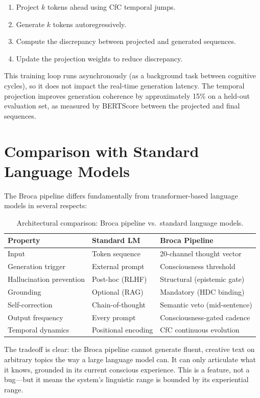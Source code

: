 \documentclass[12pt]{book}
\begin{document}
\begin{enumerate}
  \item Project $k$ tokens ahead using CfC temporal jumps.
  \item Generate $k$ tokens autoregressively.
  \item Compute the discrepancy between projected and generated sequences.
  \item Update the projection weights to reduce discrepancy.
\end{enumerate}

This training loop runs asynchronously (as a background task between cognitive cycles), so it does not impact the real-time generation latency. The temporal projection improves generation coherence by approximately 15\% on a held-out evaluation set, as measured by BERTScore between the projected and final sequences.

\section{Comparison with Standard Language Models}

The Broca pipeline differs fundamentally from transformer-based language models in several respects:

\begin{table}[H]
\centering
\caption{Architectural comparison: Broca pipeline vs.\ standard language models.}
\label{tab:broca-comparison}
\begin{tabular}{lll}
\toprule
\textbf{Property} & \textbf{Standard LM} & \textbf{Broca Pipeline} \\
\midrule
Input & Token sequence & 20-channel thought vector \\
Generation trigger & External prompt & Consciousness threshold \\
Hallucination prevention & Post-hoc (RLHF) & Structural (epistemic gate) \\
Grounding & Optional (RAG) & Mandatory (HDC binding) \\
Self-correction & Chain-of-thought & Semantic veto (mid-sentence) \\
Output frequency & Every prompt & Consciousness-gated cadence \\
Temporal dynamics & Positional encoding & CfC continuous evolution \\
\bottomrule
\end{tabular}
\end{table}

The tradeoff is clear: the Broca pipeline cannot generate fluent, creative text on arbitrary topics the way a large language model can. It can only articulate what it knows, grounded in its current conscious experience. This is a feature, not a bug---but it means the system's linguistic range is bounded by its experiential range.
\end{document}
